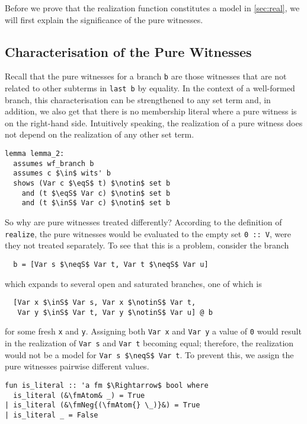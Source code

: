 \documentclass[sigplan,10pt,anonymous,review]{acmart}
\newcommand{\inS}{\in_\text{s}}
\newcommand{\notinS}{\notin_\text{s}}
\newcommand{\eqS}{=_\text{s}}
\newcommand{\neqS}{\neq_\text{s}}
\newcommand{\fmNegSymbol}{\boldsymbol{\neg}}
\newcommand{\fmNeg}[1]{$\fmNegSymbol$ #1}
\newcommand{\fmAtom}{\textbf{A}}
\begin{document}
Before we prove that the realization function constitutes a model in \autoref{sec:real}, we will first explain the significance of the pure witnesses.

\subsection{Characterisation of the Pure Witnesses\label{sec:pwits}}
Recall that the pure witnesses for a branch \lstinline!b! are those witnesses that are not related to other subterms in \lstinline!last b! by equality.
In the context of a well-formed branch, this characterisation can be strengthened to any set term and, in addition, we also get that there is no membership literal where a pure witness is on the right-hand side.
Intuitively speaking, the realization of a pure witness does not depend on the realization of any other set term.
\begin{lstlisting}
lemma lemma_2:
  assumes wf_branch b
  assumes c $\in$ wits' b
  shows (Var c $\eqS$ t) $\notin$ set b
    and (t $\eqS$ Var c) $\notin$ set b
    and (t $\inS$ Var c) $\notin$ set b
\end{lstlisting}
So why are pure witnesses treated differently?
According to the definition of \lstinline!realize!, the pure witnesses would be evaluated to the empty set \lstinline!0 :: V!, were they not treated separately. 
To see that this is a problem, consider the branch
\begin{lstlisting}
  b = [Var s $\neqS$ Var t, Var t $\neqS$ Var u]
\end{lstlisting}
which expands to several open and saturated branches, one of which is
\begin{lstlisting}
  [Var x $\inS$ Var s, Var x $\notinS$ Var t,
   Var y $\inS$ Var t, Var y $\notinS$ Var u] @ b
\end{lstlisting}
for some fresh \lstinline!x! and \lstinline!y!.
Assigning both \lstinline!Var x! and \lstinline!Var y! a value of \lstinline!0! would result in the realization of \lstinline!Var s! and \lstinline!Var t! becoming equal;
therefore, the realization would not be a model for \lstinline!Var s $\neqS$ Var t!.
To prevent this, we assign the pure witnesses pairwise different values.

\begin{lstlisting}
fun is_literal :: 'a fm $\Rightarrow$ bool where
  is_literal (&\fmAtom& _) = True
| is_literal (&\fmNeg{(\fmAtom{} \_)}&) = True
| is_literal _ = False
\end{lstlisting}
\end{document}
